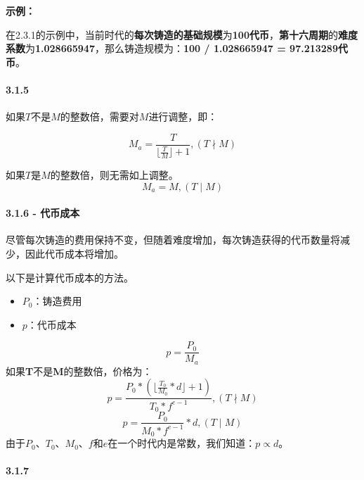 \documentclass[
]{article}
\providecommand{\tightlist}{%
  \setlength{\itemsep}{0pt}\setlength{\parskip}{0pt}}
\begin{document}
\textbf{示例：}

在2.3.1的示例中，当前时代的\textbf{每次铸造的基础规模}为\textbf{100代币}，\textbf{第十六周期}的\textbf{难度系数}为\textbf{1.028665947}，那么铸造规模为：\textbf{100
/ 1.028665947 = 97.213289代币}。

\paragraph{3.1.5}\label{section}

如果\(T\)不是\(M\)的整数倍，需要对\(M\)进行调整，即：

\begin{equation}
M_a = \frac{T}{\lfloor\frac{T}{M}\rfloor + 1}, (T \nmid M)
\end{equation}

如果\(T\)是\(M\)的整数倍，则无需如上调整。 \begin{equation}
M_a = M, (T \mid M)
\end{equation}

\paragraph{3.1.6 - 代币成本}\label{ux4ee3ux5e01ux6210ux672c}

尽管每次铸造的费用保持不变，但随着难度增加，每次铸造获得的代币数量将减少，因此代币成本将增加。

以下是计算代币成本的方法。

\begin{itemize}
\tightlist
\item
  \(P_0\)：铸造费用
\item
  \(p\)：代币成本
\end{itemize}

\begin{equation}
p = \frac{P_0}{M_a}
\end{equation} 如果\textbf{T}不是\textbf{M}的整数倍，价格为：
\begin{equation}
p = \frac{P_0*(\lfloor\frac{T_0}{M_0}*d\rfloor + 1)}{T_0*f^{e-1}}, (T \nmid M)
\end{equation} \begin{equation}
p = \frac{P_0}{M_0*f^{e-1}}*d, (T \mid M)
\end{equation}
由于\(P_0\)、\(T_0\)、\(M_0\)、\(f\)和\(e\)在一个时代内是常数，我们知道：\(p \propto d\)。

\paragraph{3.1.7}\label{section-1}
\end{document}
